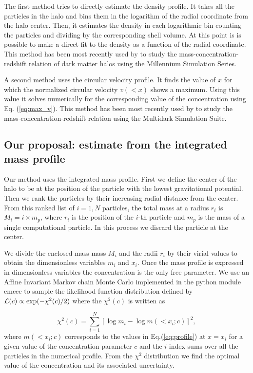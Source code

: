 \documentclass[a4,useAMS,usenatbib,usegraphicx]{mn2e}
\begin{document}
The first method tries to directly estimate the density profile.
It takes all the particles in the halo and bins them in the logarithm
of the radial coordinate from the halo center.
Then, it estimates the density in each logarithmic bin counting the
particles and dividing by the corresponding shell volume.
At this point is is possible to make a direct fit to the density as a
function of the radial coordinate.
This method has been most recently used by \cite{Ludlow2014} to study
the mass-concentration-redshift relation of dark matter halos using
the Millennium Simulation Series.


A second method uses the circular velocity profile.
It finds the value of $x$ for which the normalized circular
velocity $v(<x)$ shows a maximum.
Using this value it solves numerically for the corresponding value of
the concentration using Eq. (\ref{eq:max_v}).
This method has been most recently used by \cite{Klypin2014} to study
the mass-concentration-redshift relation using the Multidark
Simulation Suite.


\subsection{Our proposal: estimate from the integrated mass profile}
Our method uses the integrated mass profile.
First we define the center of the halo to be at the position of the
particle with the lowest gravitational potential.
Then we rank the particles by their increasing radial distance from
the center.
From this ranked list of $i=1,N$ particles, the total mass at a radius
$r_i$ is $M_i=i\times m_p$, where $r_i$ is
the position of the $i$-th particle and $m_p$ is the mass of a single
computational particle.
In this process we discard the particle at the center.

We divide the enclosed mass mass $M_i$ and the radii $r_i$ by their
virial values to obtain the dimensionless variables $m_i$ and $x_i$.
Once the mass profile is expressed in dimensionless variables the
concentration is the only free parameter. We use an Affine Invariant
Markov chain Monte Carlo implemented in the python module emcee
\citep{emcee} to sample the likelihood function distribution defined
by ${\cal L}(c)\propto \exp(-\chi^2(c)/2)$ where the $\chi^2(c)$ is written as

\begin{equation}
\chi^2(c)= \sum_{i=1}^{N}[\log m_i - \log m(< x_i;c)]^2,
\end{equation}
%
where $m(<x_i;c)$ corresponds to the values in Eq.(\ref{eq:profile}) at
$x=x_i$ for a given value of the concentration parameter $c$ and the
$i$ index sums over all the particles in the numerical profile.
From the $\chi^2$ distribution we find the optimal value of the
concentration and  its associated uncertainty.
\end{document}
